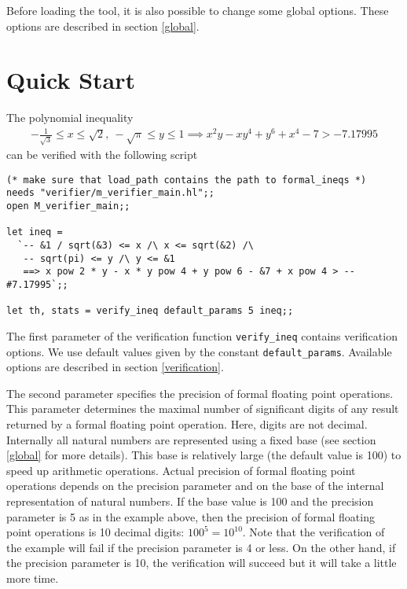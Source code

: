 \documentclass[a4paper]{article}
\begin{document}
Before loading the tool, it is also possible to change some global options. These options are described in section \ref{global}.


\section{Quick Start}

The polynomial inequality
\begin{multline*}
-\frac{1}{\sqrt{3}} \le x \le \sqrt{2},\ -\sqrt{\pi} \le y \le 1
\implies x^2 y - x y^4 + y^6 + x^4 - 7 > -7.17995
\end{multline*}
can be verified with the following script

\begin{verbatim}
(* make sure that load_path contains the path to formal_ineqs *)
needs "verifier/m_verifier_main.hl";;
open M_verifier_main;;

let ineq = 
  `-- &1 / sqrt(&3) <= x /\ x <= sqrt(&2) /\ 
   -- sqrt(pi) <= y /\ y <= &1
   ==> x pow 2 * y - x * y pow 4 + y pow 6 - &7 + x pow 4 > -- #7.17995`;;

let th, stats = verify_ineq default_params 5 ineq;;
\end{verbatim}

The first parameter of the verification function \verb|verify_ineq| contains verification options. We use default values given by the constant \verb|default_params|. Available options are described in section \ref{verification}.

The second parameter specifies the precision of formal floating point operations. This parameter determines the maximal number of significant digits of any result returned by a formal floating point operation. Here, digits are not decimal. Internally all natural numbers are represented using a fixed base (see section \ref{global} for more details). This base is relatively large (the default value is 100) to speed up arithmetic operations. Actual precision of formal floating point operations depends on the precision parameter and on the base of the internal representation of natural numbers. If the base value is 100 and the precision parameter is 5 as in the example above, then the precision of formal floating point operations is 10 decimal digits: $100^5 = 10^{10}$. Note that the verification of the example will fail if the precision parameter is 4 or less. On the other hand, if the precision parameter is 10, the verification will succeed but it will take a little more time.
\end{document}
